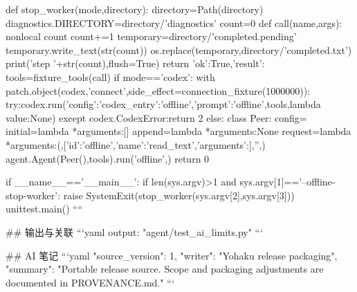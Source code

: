 def stop_worker(mode,directory):
    directory=Path(directory)
    diagnostics.DIRECTORY=directory/'diagnostics'
    count=0
    def call(name,args):
        nonlocal count
        count+=1
        temporary=directory/'completed.pending'
        temporary.write_text(str(count))
        os.replace(temporary,directory/'completed.txt')
        print('step '+str(count),flush=True)
        return {'ok':True,'result':{}}
    tools=fixture_tools(call)
    if mode=='codex':
        with patch.object(codex,'connect',side_effect=connection_fixture(1000000)):
            try:codex.run({'config':{'codex_entry':'offline'},'prompt':'offline'},tools,lambda value:None)
            except codex.CodexError:return 2
    else:
        class Peer:
            config={}
            initial=lambda *arguments:[]
            append=lambda *arguments:None
            request=lambda *arguments:({},[{'id':'offline','name':'read_text','arguments':{}}],'',{})
        agent.Agent(Peer(),tools).run('offline',{})
    return 0


if __name__=='__main__':
    if len(sys.argv)>1 and sys.argv[1]=='--offline-stop-worker':
        raise SystemExit(stop_worker(sys.argv[2],sys.argv[3]))
    unittest.main()
````

## 输出与关联
```yaml
output: "agent/test_ai_limits.py"
```

## AI 笔记
```yaml
{"source_version": 1, "writer": "Yohaku release packaging", "summary": "Portable release source. Scope and packaging adjustments are documented in PROVENANCE.md."}
```

